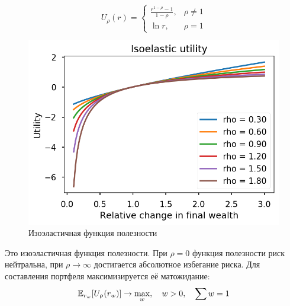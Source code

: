 \begin{minipage}{0.4\linewidth}
\begin{equation}
U_\rho(r) = \begin{cases}
\frac{r^{1-\rho}-1}{1-\rho}, &\rho\ne 1\\
\ln r, &\rho = 1
\end{cases}
\end{equation}
\end{minipage}
\begin{minipage}{0.5\linewidth}
	\begin{figure}[H]
		\centering
		\includegraphics[width=0.7\linewidth]{Thesis/images/isoelastic}
		\caption{Изоэластичная функция полезности}
		\label{fig:isoelastic}	
	\end{figure}
\end{minipage}
\vspace{.5cm}

Это изоэластичная функция полезности. При $\rho=0$ функция полезности риск нейтральна, при $\rho \to \infty$ достигается абсолютное избегание риска. Для составления портфеля максимизируется её  матожидание:
\begin{equation}
\Eb[r_w]{U_\rho(r_w)} \to \max_w, \quad w>0,\quad \sum w = 1
\end{equation}
